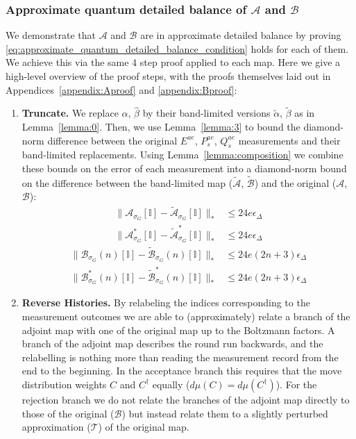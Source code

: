 \documentclass[aps,floatfix,10pt,amssymb,amsfont,amsmath,superscriptaddress,float,nofootinbib,longbibliography,nobalancelastpage,twocolumn]{revtex4-2}
\begin{document}
\subsubsection{Approximate quantum detailed balance of $\mathcal{A}$ and $\mathcal{B}$}
\label{section:proofbranchwisebalance}
We demonstrate that $\mathcal{A}$ and $\mathcal{B}$ are in approximate detailed balance by proving \eqref{eq:approximate_quantum_detailed_balance_condition} holds for each of them. We achieve this via the same 4 step proof applied to each map. Here we give a high-level overview of the proof steps, with the proofs themselves laid out in Appendices~\ref{appendix:Aproof} and \ref{appendix:Bproof}:
\begin{enumerate}
    \item \textbf{Truncate.} We replace $\hat \alpha$, $\hat \beta$ by their band-limited versions $\tilde \alpha$, $\tilde \beta$ as in Lemma~\ref{lemma:0}. Then, we use Lemma~\ref{lemma:3} to bound the diamond-norm difference between the original $E^{ae}$, $P_s^{ae}$, $Q_s^{ae}$ measurements and their band-limited replacements. Using Lemma~\ref{lemma:composition} we combine these bounds on the error of each measurement into a diamond-norm bound on the difference between the band-limited map ($\tilde{\mathcal{A}}$, $\tilde{\mathcal{B}}$) and the original ($\mathcal{A}$, $\mathcal{B}$):
        \begin{equation}
    \begin{aligned}
    \|\mathcal{A}_{\sigma_G}[\mathbb{I}] - \tilde{\mathcal{A}}_{\sigma_G}[\mathbb{I}]\|_*  &\leq 24e\epsilon_{\Delta}\\
    \|\mathcal{A}^*_{\sigma_G}[\mathbb{I}] - \tilde{\mathcal{A}}^*_{\sigma_G}[\mathbb{I}]\|_* &\leq 24e\epsilon_{\Delta}
    \end{aligned}
    \label{eq:suma1}
\end{equation}
    \begin{equation}
    \begin{aligned}
    \|\mathcal{B}_{\sigma_G}(n)[\mathbb{I}] - \tilde{\mathcal{B}}_{\sigma_G}(n)[\mathbb{I}]\|_* &\leq 24e(2n+3)\epsilon_{\Delta}
    \\ \|\mathcal{B}^*_{\sigma_G}(n)[\mathbb{I}] - \tilde{\mathcal{B}}^*_{\sigma_G}(n)[\mathbb{I}]\|_* &\leq 24e(2n+3)\epsilon_{\Delta}
    \end{aligned}
    \label{eq:sumb1}
\end{equation}
    \item \textbf{Reverse Histories.} By relabeling the indices corresponding to the measurement outcomes we are able to (approximately) relate a branch of the adjoint map with one of the original map up to the Boltzmann factors. A branch of the adjoint map describes the round run backwards, and the relabelling is nothing more than reading the measurement record from the end to the beginning. In the acceptance branch this requires that the move distribution weights $C$ and $C^{\dagger}$ equally ($d\mu(C) = d\mu(C^{\dagger})$). For the rejection branch we do not relate the branches of the adjoint map directly to those of the original ($\mathcal{B}$) but instead relate them to a slightly perturbed approximation ($\mathcal{T}$) of the original map.
    

\end{enumerate}
\end{document}
